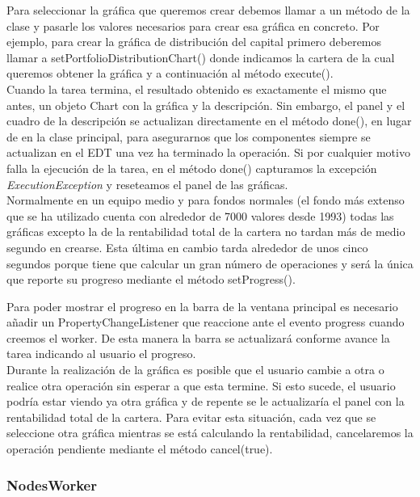 \documentclass[12pt, a4paper]{article}
\begin{document}
Para seleccionar la gráfica que queremos crear debemos llamar a un método de la clase y pasarle los valores necesarios para crear esa gráfica en concreto. Por ejemplo, para crear la gráfica de distribución del capital primero deberemos llamar a setPortfolioDistributionChart() donde indicamos la cartera de la cual queremos obtener la gráfica y a continuación al método execute().\\

Cuando la tarea termina, el resultado obtenido es exactamente el mismo que antes, un objeto Chart con la gráfica y la descripción. Sin embargo, el panel y el cuadro de la descripción se actualizan directamente en el método done(), en lugar de en la clase principal, para asegurarnos que los componentes siempre se actualizan en el \gls{EDT} una vez ha terminado la operación. Si por cualquier motivo falla la ejecución de la tarea, en el método done() capturamos la excepción \textit{ExecutionException} y reseteamos el panel de las gráficas.\\

Normalmente en un equipo medio y para fondos normales (el fondo más extenso que se ha utilizado cuenta con alrededor de 7000 valores desde 1993) todas las gráficas excepto la de la rentabilidad total de la cartera no tardan más de medio segundo en crearse. Esta última en cambio tarda alrededor de unos cinco segundos porque tiene que calcular un gran número de operaciones y  será la única que reporte su progreso mediante el método setProgress().\\


\newpage

Para poder mostrar el progreso en la barra de la ventana principal es necesario añadir un PropertyChangeListener que reaccione ante el evento progress cuando creemos el worker. De esta manera la barra se actualizará conforme avance la tarea indicando al usuario el progreso.\\


Durante la realización de la gráfica es posible que el usuario cambie a otra o realice otra operación sin esperar a que esta termine. Si esto sucede, el usuario podría estar viendo ya otra gráfica y de repente se le actualizaría el panel con la rentabilidad total de la cartera. Para evitar esta situación, cada vez que se seleccione otra gráfica mientras se está calculando la rentabilidad, cancelaremos la operación pendiente mediante el método cancel(true).


\subsubsection{NodesWorker}
\end{document}
